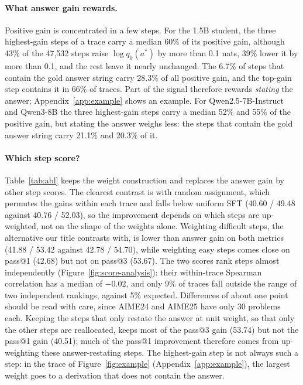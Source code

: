 \documentclass[11pt]{article}
\begin{document}
\paragraph{What answer gain rewards.}
\label{sec:what-gain}
Positive gain is concentrated in a few steps.
For the 1.5B student, the three highest-gain steps of a trace carry a median 60\% of its positive gain, although 43\% of the 47,532 steps raise $\log q_0(a^*)$ by more than 0.1 nats, 39\% lower it by more than 0.1, and the rest leave it nearly unchanged.
The 6.7\% of steps that contain the gold answer string carry 28.3\% of all positive gain, and the top-gain step contains it in 66\% of traces.
Part of the signal therefore rewards \emph{stating} the answer; Appendix~\ref{app:example} shows an example.
For Qwen2.5-7B-Instruct and Qwen3-8B the three highest-gain steps carry a median 52\% and 55\% of the positive gain, but stating the answer weighs less: the steps that contain the gold answer string carry 21.1\% and 20.3\% of it.

\paragraph{Which step score?}
Table~\ref{tab:abl} keeps the weight construction and replaces the answer gain by other step scores.
The clearest contrast is with random assignment, which permutes the gains within each trace and falls below uniform SFT (40.60 / 49.48 against 40.76 / 52.03), so the improvement depends on which steps are up-weighted, not on the shape of the weights alone.
Weighting difficult steps, the alternative our title contrasts with, is lower than answer gain on both metrics (41.88 / 53.42 against 42.78 / 54.70), while weighting easy steps comes close on pass@1 (42.68) but not on pass@3 (53.67).
The two scores rank steps almost independently (Figure~\ref{fig:score-analysis}): their within-trace Spearman correlation has a median of $-0.02$, and only 9\% of traces fall outside the range of two independent rankings, against 5\% expected.
Differences of about one point should be read with care, since AIME24 and AIME25 have only 30 problems each.
Keeping the steps that only restate the answer at unit weight, so that only the other steps are reallocated, keeps most of the pass@3 gain (53.74) but not the pass@1 gain (40.51); much of the pass@1 improvement therefore comes from up-weighting these answer-restating steps.
The highest-gain step is not always such a step: in the trace of Figure~\ref{fig:example} (Appendix~\ref{app:example}), the largest weight goes to a derivation that does not contain the answer.
\end{document}

